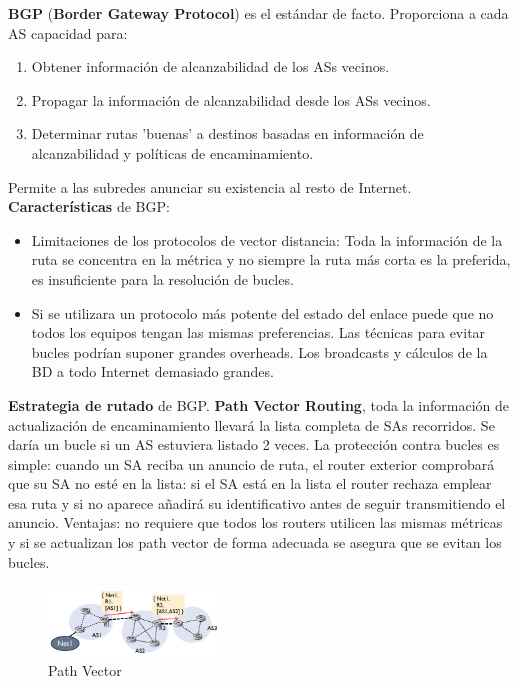 \documentclass[10pt,portrait, twocolumn]{article}
\begin{document}
\textbf{BGP} (\textbf{Border Gateway Protocol}) es el estándar de facto. Proporciona a cada AS capacidad para:

	\begin{enumerate}
		\item Obtener información de alcanzabilidad de los ASs vecinos.
		\item Propagar la información de alcanzabilidad desde los ASs vecinos.
		\item Determinar rutas 'buenas' a destinos basadas en información de alcanzabilidad y políticas de encaminamiento.
	\end{enumerate}
	
Permite a las subredes anunciar su existencia al resto de Internet. \textbf{Características} de BGP:

	\begin{itemize}
		\item Limitaciones de los protocolos de vector distancia: Toda la información de la ruta se concentra en la métrica y no siempre la ruta más corta es la preferida, es insuficiente para la resolución de bucles.
		\item Si se utilizara un protocolo más potente del estado del enlace puede que no todos los equipos tengan las mismas preferencias. Las técnicas para evitar bucles podrían suponer grandes overheads. Los broadcasts y cálculos de la BD a todo Internet demasiado grandes.
	\end{itemize}

\textbf{Estrategia de rutado} de BGP. \textbf{Path Vector Routing}, toda la información de actualización de encaminamiento llevará la lista completa de SAs recorridos. Se daría un bucle si un AS estuviera listado 2 veces. La protección contra bucles es simple: cuando un SA reciba un anuncio de ruta, el router exterior comprobará que su SA no esté en la lista: si el SA está en la lista el router rechaza emplear esa ruta y si no aparece añadirá su identificativo antes de seguir transmitiendo el anuncio. Ventajas: no requiere que todos los routers utilicen las mismas métricas y si se actualizan los path vector de forma adecuada se asegura que se evitan los bucles.
  
\begin{figure}[h]
	\centering
     \includegraphics[width=0.4\textwidth]{PathVector}
      \caption{Path Vector}
      \label{fig:Regiones de frecuencias}
  \end{figure}
	
\end{document}
